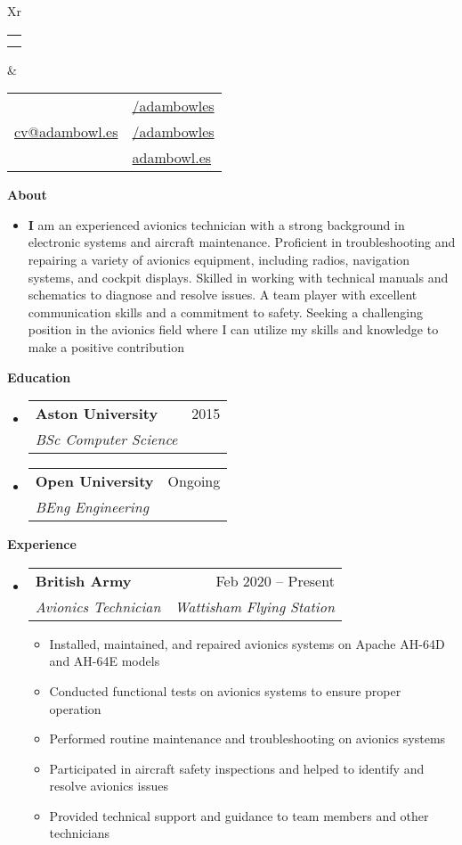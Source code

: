 \documentclass[letterpaper,12pt]{article}[leftmargin=*]
\makeatletter
\def \fullname {Adam Bowles}
\def \subtitle {}
\def \linkedinicon {\faLinkedin}
\def \linkedinlink {https://linkedin.com/in/adambowles/}
\def \linkedintext {/adambowles}
\def \phoneicon {\faPhone}
\def \phonetext {07584 356713}
\def \emailicon {\faEnvelope}
\def \emaillink {mailto:cv@adambowl.es}
\def \emailtext {cv@adambowl.es}
\def \githubicon {\faGithub}
\def \githublink {https://github.com/adambowles}
\def \githubtext {/adambowles}
\def \websiteicon {\faGlobe}
\def \websitelink {https://adambowl.es/}
\def \websitetext {adambowl.es}
\def \headertype {\doublecol} %
\def \entryspacing {-0pt}
\def \linkedin {\linkedinicon \hspace{3pt}\href{\linkedinlink}{\linkedintext}}
\def \phone {\phoneicon \hspace{3pt}{ \phonetext}}
\def \email {\emailicon \hspace{3pt}\href{\emaillink}{\emailtext}}
\def \github {\githubicon \hspace{3pt}\href{\githublink}{\githubtext}}
\def \website {\websiteicon \hspace{3pt}\href{\websitelink}{\websitetext}}
\renewcommand{\section}[2]{\vspace{5pt}
  \colorbox{secondary}{\color{white}\raggedbottom\normalsize\textbf{{#1}{\hspace{7pt}#2}}}
}
\newcommand{\resumeEntryStart}{\begin{itemize}[leftmargin=2.5mm]}
\newcommand{\resumeEntryEnd}{\end{itemize}\vspace{\entryspacing}}
\newcommand{\resumeItemListStart}{\begin{itemize}[leftmargin=4.5mm]}
\newcommand{\resumeItemListEnd}{\end{itemize}}
\newcommand{\resumeItem}[1]{
  \item\small{
    {#1 \vspace{-2pt}}
  }
}
\newcommand{\resumeEntryTSDL}[4]{
  \vspace{-1pt}\item[]
    \begin{tabularx}{0.97\textwidth}{X@{\hspace{60pt}}r}
      \textbf{\color{primary}#1} & {\firabook\color{accent}\small#2} \\
      \textit{\color{accent}\small#3} & \textit{\color{accent}\small#4} \\
    \end{tabularx}\vspace{-6pt}
}
\newcommand{\resumeEntryS}[2]{
  \item[]\small{
    \textbf{\color{primary}#1 }{ #2 \vspace{-6pt}}
  }
}
\newcommand{\doublecol}[6]{
  \begin{tabularx}{\textwidth}{Xr}
    {
      \begin{tabular}[c]{l}
        \fontsize{35}{45}\selectfont{\color{primary}{{\textbf{\fullname}}}} \\
        {\textit{\subtitle}} %
      \end{tabular}
    } & {
      \begin{tabular}[c]{l@{\hspace{1.5em}}l}
        {\small#4} & {\small#1} \\
        {\small#5} & {\small#2} \\
        {\small#6} & {\small#3}
      \end{tabular}
    }
  \end{tabularx}
}
\newcommand{\singlecol}[6]{
  \begin{tabularx}{\textwidth}{Xr}
    {
      \begin{tabular}[b]{l}
        \fontsize{35}{45}\selectfont{\color{primary}{{\textbf{\fullname}}}} \\
        {\textit{\subtitle}} %
      \end{tabular}
    } & {
      \begin{tabular}[c]{l}
        {\small#1} \\
        {\small#2} \\
        {\small#3} \\
        {\small#4} \\
        {\small#5} \\
        {\small#6}
      \end{tabular}
    }
  \end{tabularx}
}
\makeatother
\begin{document}


\headertype{\linkedin}{\github}{\website}{\phone}{\email}{} %
\vspace{-10pt} %

\section{\faInfo}{About}

  \resumeEntryStart
    \resumeEntryS{I}{am an experienced avionics technician with a strong background in electronic systems and aircraft maintenance. Proficient in troubleshooting and repairing a variety of avionics equipment, including radios, navigation systems, and cockpit displays. Skilled in working with technical manuals and schematics to diagnose and resolve issues. A team player with excellent communication skills and a commitment to safety. Seeking a challenging position in the avionics field where I can utilize my skills and knowledge to make a positive contribution}
 \resumeEntryEnd

\section{\faGraduationCap}{Education}

  \resumeEntryStart
    \resumeEntryTSDL
      {Aston University}{2015}
      {BSc Computer Science}{}
    \resumeEntryTSDL
      {Open University}{Ongoing}
      {BEng Engineering}{}
  \resumeEntryEnd

\section{\faPieChart}{Experience}

  \resumeEntryStart
    \resumeEntryTSDL
      {British Army}{Feb 2020 -- Present}
      {Avionics Technician}{Wattisham Flying Station}
    \resumeItemListStart
      \resumeItem {Installed, maintained, and repaired avionics systems on Apache AH-64D and AH-64E models}
      \resumeItem {Conducted functional tests on avionics systems to ensure proper operation}
      \resumeItem {Performed routine maintenance and troubleshooting on avionics systems}
      \resumeItem {Participated in aircraft safety inspections and helped to identify and resolve avionics issues}
      \resumeItem {Provided technical support and guidance to team members and other technicians}
    \resumeItemListEnd
  \resumeEntryEnd
\end{document}
